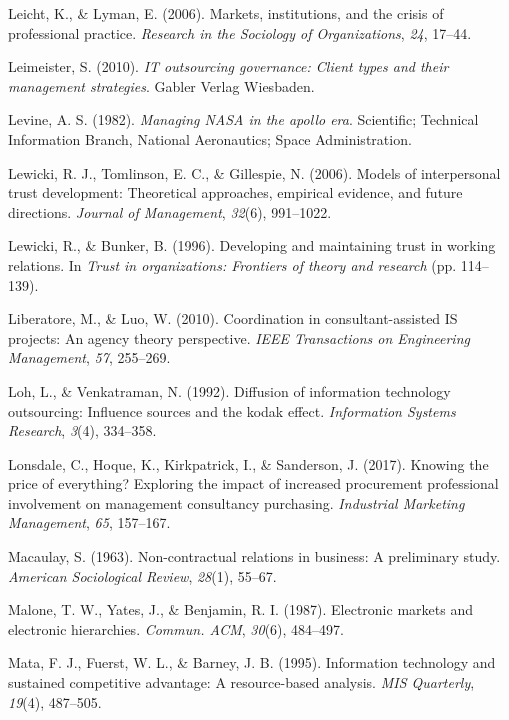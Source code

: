 \documentclass[
  man,floatsintext]{apa6}
\newlength{\cslhangindent}
\newenvironment{CSLReferences}[2] %
 {\begin{list}{}{%
  \setlength{\itemindent}{0pt}
  \setlength{\leftmargin}{0pt}
  \setlength{\parsep}{0pt}
  \ifodd #1
   \setlength{\leftmargin}{\cslhangindent}
   \setlength{\itemindent}{-1\cslhangindent}
  \fi
  \setlength{\itemsep}{#2\baselineskip}}}
 {\end{list}}
\begin{document}
\begin{CSLReferences}{1}{0}
Leicht, K., \& Lyman, E. (2006). Markets, institutions, and the crisis of professional practice. \emph{Research in the Sociology of Organizations}, \emph{24}, 17--44.

Leimeister, S. (2010). \emph{IT outsourcing governance: Client types and their management strategies}. Gabler Verlag Wiesbaden.

Levine, A. S. (1982). \emph{Managing NASA in the apollo era}. Scientific; Technical Information Branch, National Aeronautics; Space Administration.

Lewicki, R. J., Tomlinson, E. C., \& Gillespie, N. (2006). Models of interpersonal trust development: Theoretical approaches, empirical evidence, and future directions. \emph{Journal of Management}, \emph{32}(6), 991--1022.

Lewicki, R., \& Bunker, B. (1996). Developing and maintaining trust in working relations. In \emph{Trust in organizations: Frontiers of theory and research} (pp. 114--139).

Liberatore, M., \& Luo, W. (2010). Coordination in consultant-assisted IS projects: An agency theory perspective. \emph{IEEE Transactions on Engineering Management}, \emph{57}, 255--269.

Loh, L., \& Venkatraman, N. (1992). Diffusion of information technology outsourcing: Influence sources and the kodak effect. \emph{Information Systems Research}, \emph{3}(4), 334--358.

Lonsdale, C., Hoque, K., Kirkpatrick, I., \& Sanderson, J. (2017). Knowing the price of everything? Exploring the impact of increased procurement professional involvement on management consultancy purchasing. \emph{Industrial Marketing Management}, \emph{65}, 157--167.

Macaulay, S. (1963). Non-contractual relations in business: A preliminary study. \emph{American Sociological Review}, \emph{28}(1), 55--67.

Malone, T. W., Yates, J., \& Benjamin, R. I. (1987). Electronic markets and electronic hierarchies. \emph{Commun. ACM}, \emph{30}(6), 484--497.

Mata, F. J., Fuerst, W. L., \& Barney, J. B. (1995). Information technology and sustained competitive advantage: A resource-based analysis. \emph{MIS Quarterly}, \emph{19}(4), 487--505.


\end{CSLReferences}
\end{document}

